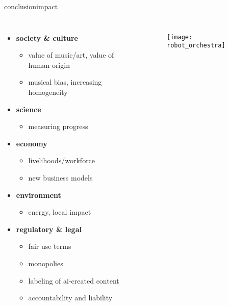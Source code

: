
\begin{frame}{conclusion}{impact}
    \vspace{-9mm}
    \begin{columns}
    \begin{itemize}
        \item \textbf{society \& culture}
            \begin{itemize}
                \item value of music/art, value of human origin
                \item musical bias, increasing homogeneity
            \end{itemize}
        \item \textbf{science} 
            \begin{itemize}
                \item measuring progress
            \end{itemize}
        \item \textbf{economy}
            \begin{itemize}
                \item livelihoods/workforce
                \item new business models
            \end{itemize}
        \item \textbf{environment}
            \begin{itemize}
                \item energy, local impact
            \end{itemize}
        \item \textbf{regulatory \& legal}
                \begin{itemize}
                    \item fair use terms
                    \item monopolies
                    \item labeling of ai-created content
                    \item accountability and liability
                \end{itemize}
    \end{itemize}
        \vspace{10mm}
        \begin{figure}%
            \texttt{[image: robot\_orchestra]}%
        \end{figure}
    \end{columns}
\end{frame}

